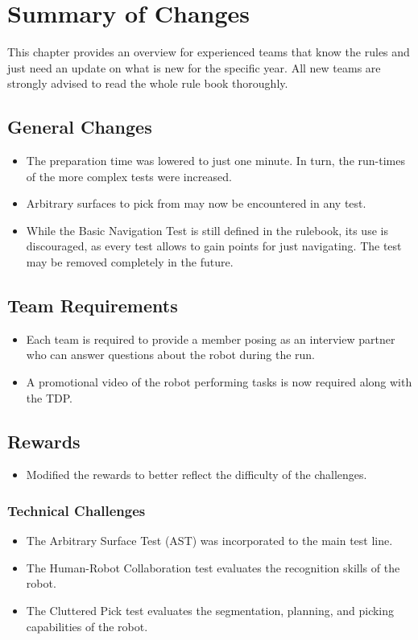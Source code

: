 
\chapter{Summary of Changes}


This chapter provides an overview for experienced teams that know the rules and just need an update on what is new for the specific year. All new teams are strongly advised to read the whole rule book thoroughly.

\section{General Changes}
\begin{itemize}
  \item The preparation time was lowered to just one minute. In turn, the run-times of the more complex tests were increased.
  \item Arbitrary surfaces to pick from may now be encountered in any test.
  \item While the Basic Navigation Test is still defined in the rulebook, its use is discouraged, as every test allows to gain points for just navigating. The test may be removed completely in the future.
\end{itemize}

\section{Team Requirements}
\begin{itemize}
  \item Each team is required to provide a member posing as an interview partner who can answer questions about the robot during the run.
  \item A promotional video of the robot performing {\RCAW} tasks is now required along with the TDP.
\end{itemize}

\section{Rewards}
\begin{itemize}
  \item Modified the rewards to better reflect the difficulty of the challenges.
\end{itemize}

\subsection{Technical Challenges}
\begin{itemize}
  \item The Arbitrary Surface Test (AST) was incorporated to the main test line.
  \item The Human-Robot Collaboration test evaluates the recognition skills of the robot.
  \item The Cluttered Pick test evaluates the segmentation, planning, and picking capabilities of the robot.
\end{itemize}
